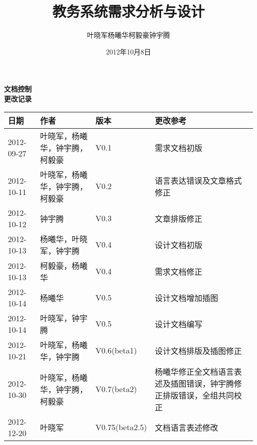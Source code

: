 \documentclass[a4paper,12pt]{article}
\begin{document}
\begin{CJK*}{UTF8}{stzhongsong}

\title{教务系统需求分析与设计}
\author{叶晓军\quad 杨曦华\quad 柯毅豪\quad 钟宇腾}
\date{2012年10月8日}



\noindent \textbf{\LARGE 文档控制}\\

\noindent \textbf{\large 更改记录}\\
\begin{table}[H]
  \begin{tabularx}{\textwidth}{|l|l|l|X|}
    \hline
    \textbf{日期} & \textbf{作者} & \textbf{版本} & \textbf{更改参考}\\
    \hline
    2012-09-27&叶晓军，杨曦华，钟宇腾，柯毅豪&V0.1&需求文档初版\\
    \hline
    2012-10-11&叶晓军，杨曦华，钟宇腾，柯毅豪&V0.2&语言表达错误及文章格式修正\\
    \hline
    2012-10-12&钟宇腾&V0.3&文章排版修正\\
    \hline
    2012-10-13&杨曦华，叶晓军，钟宇腾&V0.4&设计文档初版\\
    \hline
    2012-10-13&柯毅豪，杨曦华&V0.4&需求文档修正\\
    \hline
    2012-10-14&杨曦华&V0.5&设计文档增加插图\\
    \hline
    2012-10-14&叶晓军，钟宇腾&V0.5&设计文档编写\\
    \hline
    2012-10-21&叶晓军，杨曦华，钟宇腾&V0.6(beta1)&设计文档排版及插图修正\\
    \hline
    2012-10-30&叶晓军，杨曦华，钟宇腾，柯毅豪&V0.7(beta2)&杨曦华修正全文档语言表述及插图错误，钟宇腾修正排版错误，全组共同校正\\
    \hline
    2012-12-20&叶晓军&V0.75(beta2.5)&文档语言表述修改\\
    \hline
  \end{tabularx}
\end{table}

\newpage

\tableofcontents
\newpage

\pagestyle{fancy}

\newpage


\newpage


\newpage


\newpage
\end{CJK*}
\end{document}
